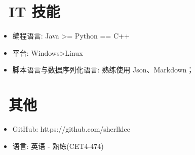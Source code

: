 \documentclass{resume}
\begin{document}
\section{\faCogs\ IT 技能}
\begin{itemize}[parsep=0.5ex]
  \item 编程语言: Java >= Python == C++ 
  \item 平台: Windows>Linux
  \item 脚本语言与数据序列化语言: 熟练使用 Json、Markdown；
\end{itemize}

\section{\faInfo\ 其他}
\begin{itemize}[parsep=0.5ex]
  \item GitHub: https://github.com/sherlklee
  \item 语言: 英语 - 熟练(CET4-474)
\end{itemize}

%
%
\end{document}
